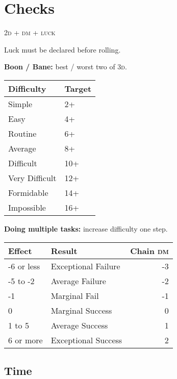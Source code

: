 \documentclass[10pt]{article}
\newenvironment{emphbox}{\begin{Sbox}\begin{minipage}{\columnwidth - 2\fboxsep - 2\fboxrule - \shadowsize}\small}{\end{minipage}\end{Sbox}\shadowbox{\TheSbox}}
\newcommand\dice[1]{\textsc{#1}}
\begin{document}
\footnotesize

\section{Checks}

\begin{multicols}{3}
\begin{emphbox}
  \begin{center}
    \dice{2d + dm + luck}

    Luck must be declared before rolling.

    \textbf{Boon / Bane:} best / worst two of \dice{3d}.
  \end{center}
\end{emphbox}

\begin{tabularx}{\linewidth}{Xl} \toprule
Difficulty & Target \\ \midrule
Simple & 2+ \\
Easy & 4+ \\
Routine & 6+ \\
Average & 8+ \\
Difficult & 10+ \\
Very Difficult & 12+ \\
Formidable & 14+ \\
Impossible & 16+ \\ \bottomrule
\end{tabularx}

\textbf{Doing multiple tasks:} increase difficulty one step.

\columnbreak

\begin{tabularx}{\linewidth}{lXr} \toprule
Effect & Result & Chain \textsc{dm} \\ \midrule
-6 or less & Exceptional Failure & -3 \\
-5 to -2 & Average Failure & -2 \\
-1 & Marginal Fail & -1 \\
0 & Marginal Success & 0 \\
1 to 5 & Average Success & 1 \\
6 or more & Exceptional Success & 2 \\ \bottomrule
\end{tabularx}

\subsection{Time}


\end{multicols}
\end{document}
